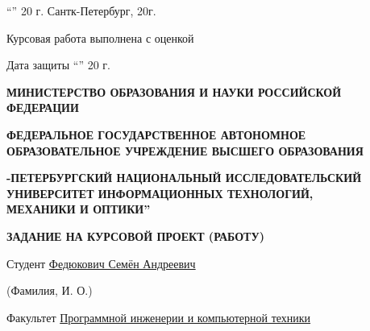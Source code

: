\documentclass[12pt]{article}
\begin{document}
\bigskip\bigskip\bigskip\bigskip

\begin{center}
\textquotedblleft\underline{\hspace{15pt}}\textquotedblright \underline{\hspace{60pt}} 20\underline{\hspace{15pt}} \hspace{30pt} г. Сантк-Петербург,  \hspace{30pt} 20\underline{\hspace{15pt}}г.
\end{center}

\bigskip\bigskip\bigskip\bigskip
\hspace{50pt} Курсовая работа выполнена с оценкой \hspace{10pt} \underline{\hspace{140pt}}

\bigskip\bigskip
\hspace{50pt} Дата защиты \textquotedblleft\underline{\hspace{15pt}}\textquotedblright \underline{\hspace{60pt}} 20\underline{\hspace{15pt}} г.
\newpage

\pagestyle{plain}
\begin{center}
\bigskip\bigskip\bigskip\bigskip\bigskip\bigskip\bigskip\bigskip\bigskip\bigskip\bigskip\bigskip\bigskip\bigskip\bigskip\bigskip\bigskip\bigskip
\normalsize
\textbf{МИНИСТЕРСТВО ОБРАЗОВАНИЯ И НАУКИ РОССИЙСКОЙ ФЕДЕРАЦИИ}

\medskip 
\textbf{ФЕДЕРАЛЬНОЕ ГОСУДАРСТВЕННОЕ АВТОНОМНОЕ ОБРАЗОВАТЕЛЬНОЕ УЧРЕЖДЕНИЕ ВЫСШЕГО ОБРАЗОВАНИЯ}

\medskip 
\textbf{-ПЕТЕРБУРГСКИЙ НАЦИОНАЛЬНЫЙ ИССЛЕДОВАТЕЛЬСКИЙ }
\textbf{УНИВЕРСИТЕТ ИНФОРМАЦИОННЫХ ТЕХНОЛОГИЙ, }\\
\textbf{МЕХАНИКИ И ОПТИКИ\textquotedblright}

\bigskip\bigskip
\textbf{ЗАДАНИЕ НА КУРСОВОЙ ПРОЕКТ (РАБОТУ)} 
\bigskip\bigskip
\end{center}

\normalsize \noindent Студент \uline{\hspace{140pt}Федюкович Семён Андреевич\hspace*{\fill}}

\hspace{8cm} \scriptsize (Фамилия, И. О.) 

\normalsize \noindent Факультет \uline{\hspace{80pt}Программной инженерии и компьютерной техники\hspace*{\fill}}
\end{document}
